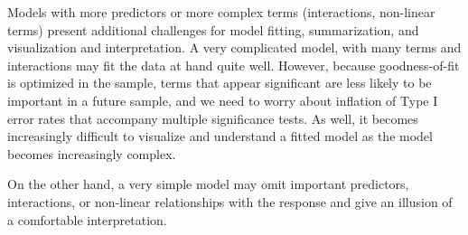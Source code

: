 \documentclass[11pt]{book}\usepackage[]{graphicx}\usepackage[]{color}
\begin{document}
Models with more predictors or more complex terms (interactions, non-linear terms)
present additional challenges for model fitting, summarization,
and visualization and interpretation.
A very complicated model, with many terms and interactions may fit the data at hand
quite well. However, because goodness-of-fit is optimized in the sample, 
terms that appear significant are less likely to be important in a future sample,
and we need to worry about inflation of Type I error rates that accompany
multiple significance tests.  As well, it becomes increasingly difficult to
visualize and understand a fitted model as the model becomes increasingly complex.

On the other hand, a very simple model may omit important predictors, interactions, or
non-linear relationships with the response and give an illusion of a comfortable
interpretation.  

\end{document}
